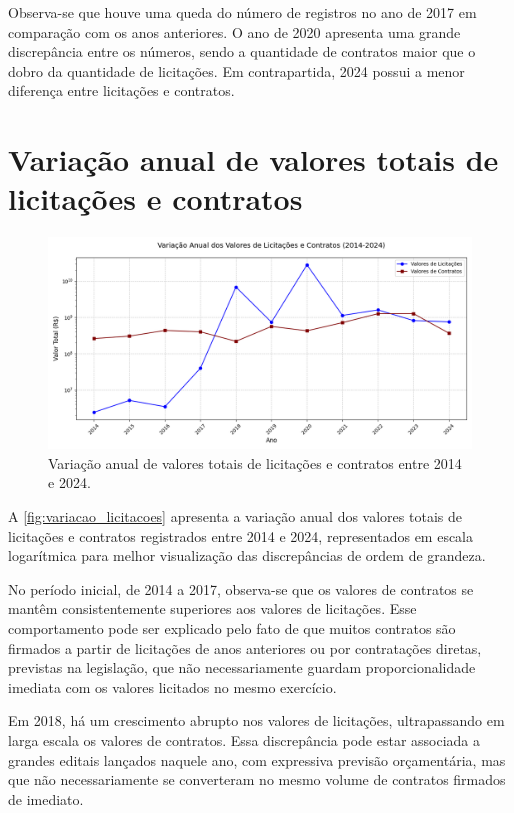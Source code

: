 \documentclass[
	12pt,				%
	oneside,			%
	a4paper,			%
	chapter=TITLE,		%
	section=TITLE,		%
	english,			%
	brazil				%
	]{abntex2}
\begin{document}
Observa-se que houve uma queda do número de registros no ano de 2017 em comparação com os anos anteriores. O ano de 2020 apresenta uma grande discrepância entre os números, sendo a quantidade de contratos maior que o dobro da quantidade de licitações. Em contrapartida, 2024 possui a menor diferença entre licitações e contratos.

\section*{Variação anual de valores totais de licitações e contratos}

\begin{figure}[h]
	\begin{center}
		\caption{\label{fig:variacao_licitacoes}Variação anual de valores totais de licitações e contratos entre 2014 e 2024.}
		\includegraphics[scale=0.41,trim={0 0 0 2cm},clip]{images/variacao_anual_valores.png} %
	\end{center}
\end{figure}

A \autoref{fig:variacao_licitacoes} apresenta a variação anual dos valores totais de licitações e contratos registrados entre 2014 e 2024, representados em escala logarítmica para melhor visualização das discrepâncias de ordem de grandeza.

No período inicial, de 2014 a 2017, observa-se que os valores de contratos se mantêm consistentemente superiores aos valores de licitações. Esse comportamento pode ser explicado pelo fato de que muitos contratos são firmados a partir de licitações de anos anteriores ou por contratações diretas, previstas na legislação, que não necessariamente guardam proporcionalidade imediata com os valores licitados no mesmo exercício.

Em 2018, há um crescimento abrupto nos valores de licitações, ultrapassando em larga escala os valores de contratos. Essa discrepância pode estar associada a grandes editais lançados naquele ano, com expressiva previsão orçamentária, mas que não necessariamente se converteram no mesmo volume de contratos firmados de imediato.
\end{document}
